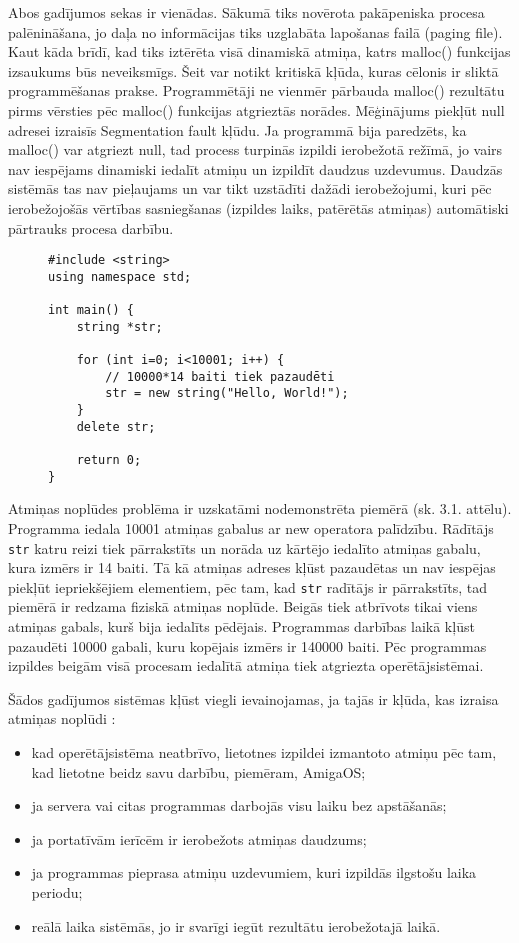 Abos gadījumos sekas ir vienādas.
Sākumā tiks novērota pakāpeniska procesa palēnināšana, jo daļa no informācijas tiks uzglabāta lapošanas failā (paging file).
Kaut kāda brīdī, kad tiks iztērēta visā dinamiskā atmiņa, katrs malloc() funkcijas izsaukums būs neveiksmīgs.
Šeit var notikt kritiskā kļūda, kuras cēlonis ir sliktā programmēšanas prakse.
Programmētāji ne vienmēr pārbauda malloc() rezultātu pirms vērsties pēc malloc() funkcijas atgrieztās norādes.  
Mēģinājums piekļūt null adresei  izraisīs Segmentation fault kļūdu.
Ja programmā bija paredzēts, ka malloc() var atgriezt null, tad process turpinās izpildi ierobežotā režīmā, jo vairs nav iespējams dinamiski iedalīt atmiņu un izpildīt daudzus uzdevumus. 
Daudzās sistēmās tas nav pieļaujams un var tikt uzstādīti dažādi ierobežojumi, kuri pēc ierobežojošās vērtības sasniegšanas (izpildes laiks, patērētās atmiņas) automātiski pārtrauks procesa darbību. 

\begin{figure}[h]
\begin{lstlisting}
#include <string>
using namespace std;

int main() {
    string *str;

    for (int i=0; i<10001; i++) {
        // 10000*14 baiti tiek pazaudēti
        str = new string("Hello, World!");
    }
    delete str;

    return 0;
}
\end{lstlisting}
\caption{\textbf{\fontsize{11}{12}\selectfont {Atmiņas noplūde, C++}}}
\end{figure}

Atmiņas noplūdes problēma ir uzskatāmi nodemonstrēta piemērā (sk. 3.1. attēlu).
Programma  iedala 10001 atmiņas gabalus ar new operatora palīdzību. 
Rādītājs \texttt{str} katru reizi tiek pārrakstīts un norāda uz kārtējo iedalīto atmiņas gabalu, kura izmērs ir 14 baiti.
Tā kā atmiņas adreses kļūst pazaudētas un nav iespējas piekļūt iepriekšējiem elementiem, pēc tam, kad  \texttt{str} radītājs ir pārrakstīts, tad piemērā ir redzama fiziskā atmiņas noplūde.
Beigās tiek atbrīvots tikai viens atmiņas gabals, kurš bija iedalīts pēdējais. 
Programmas darbības laikā kļūst pazaudēti 10000 gabali, kuru kopējais izmērs ir 140000 baiti.
 Pēc programmas izpildes beigām visā procesam iedalītā atmiņa tiek atgriezta operētājsistēmai.


Šādos gadījumos sistēmas kļūst viegli ievainojamas, ja tajās ir kļūda, kas izraisa atmiņas noplūdi \cite{RTTV}: 
\begin{itemize}
\item { kad operētājsistēma neatbrīvo, lietotnes izpildei izmantoto atmiņu pēc tam, kad lietotne beidz savu darbību, piemēram, AmigaOS;}
\item { ja servera vai citas programmas darbojās visu laiku bez apstāšanās; }
\item { ja portatīvām ierīcēm ir ierobežots atmiņas daudzums;}
\item { ja programmas pieprasa atmiņu uzdevumiem, kuri izpildās ilgstošu laika periodu; }
\item { reālā laika sistēmās, jo ir svarīgi iegūt rezultātu ierobežotajā laikā. }
\end{itemize}

